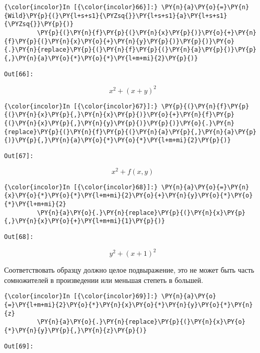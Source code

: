     \begin{Verbatim}[commandchars=\\\{\}]
{\color{incolor}In [{\color{incolor}66}]:} \PY{n}{a}\PY{o}{=}\PY{n}{Wild}\PY{p}{(}\PY{l+s+s1}{\PYZsq{}}\PY{l+s+s1}{a}\PY{l+s+s1}{\PYZsq{}}\PY{p}{)}
         \PY{p}{(}\PY{n}{f}\PY{p}{(}\PY{n}{x}\PY{p}{)}\PY{o}{+}\PY{n}{f}\PY{p}{(}\PY{n}{x}\PY{o}{+}\PY{n}{y}\PY{p}{)}\PY{p}{)}\PY{o}{.}\PY{n}{replace}\PY{p}{(}\PY{n}{f}\PY{p}{(}\PY{n}{a}\PY{p}{)}\PY{p}{,}\PY{n}{a}\PY{o}{*}\PY{o}{*}\PY{l+m+mi}{2}\PY{p}{)}
\end{Verbatim}
\texttt{\color{outcolor}Out[{\color{outcolor}66}]:}
    
    \[x^{2} + \left(x + y\right)^{2}\]

    

    \begin{Verbatim}[commandchars=\\\{\}]
{\color{incolor}In [{\color{incolor}67}]:} \PY{p}{(}\PY{n}{f}\PY{p}{(}\PY{n}{x}\PY{p}{,}\PY{n}{x}\PY{p}{)}\PY{o}{+}\PY{n}{f}\PY{p}{(}\PY{n}{x}\PY{p}{,}\PY{n}{y}\PY{p}{)}\PY{p}{)}\PY{o}{.}\PY{n}{replace}\PY{p}{(}\PY{n}{f}\PY{p}{(}\PY{n}{a}\PY{p}{,}\PY{n}{a}\PY{p}{)}\PY{p}{,}\PY{n}{a}\PY{o}{*}\PY{o}{*}\PY{l+m+mi}{2}\PY{p}{)}
\end{Verbatim}
\texttt{\color{outcolor}Out[{\color{outcolor}67}]:}
    
    \[x^{2} + f{\left (x,y \right )}\]

    

    \begin{Verbatim}[commandchars=\\\{\}]
{\color{incolor}In [{\color{incolor}68}]:} \PY{n}{a}\PY{o}{=}\PY{n}{x}\PY{o}{*}\PY{o}{*}\PY{l+m+mi}{2}\PY{o}{+}\PY{n}{y}\PY{o}{*}\PY{o}{*}\PY{l+m+mi}{2}
         \PY{n}{a}\PY{o}{.}\PY{n}{replace}\PY{p}{(}\PY{n}{x}\PY{p}{,}\PY{n}{x}\PY{o}{+}\PY{l+m+mi}{1}\PY{p}{)}
\end{Verbatim}
\texttt{\color{outcolor}Out[{\color{outcolor}68}]:}
    
    \[y^{2} + \left(x + 1\right)^{2}\]

    

    Соответствовать образцу должно целое подвыражение, это не может быть
часть сомножителей в произведении или меньшая степеть в большей.

    \begin{Verbatim}[commandchars=\\\{\}]
{\color{incolor}In [{\color{incolor}69}]:} \PY{n}{a}\PY{o}{=}\PY{l+m+mi}{2}\PY{o}{*}\PY{n}{x}\PY{o}{*}\PY{n}{y}\PY{o}{*}\PY{n}{z}
         \PY{n}{a}\PY{o}{.}\PY{n}{replace}\PY{p}{(}\PY{n}{x}\PY{o}{*}\PY{n}{y}\PY{p}{,}\PY{n}{z}\PY{p}{)}
\end{Verbatim}
\texttt{\color{outcolor}Out[{\color{outcolor}69}]:}
    
